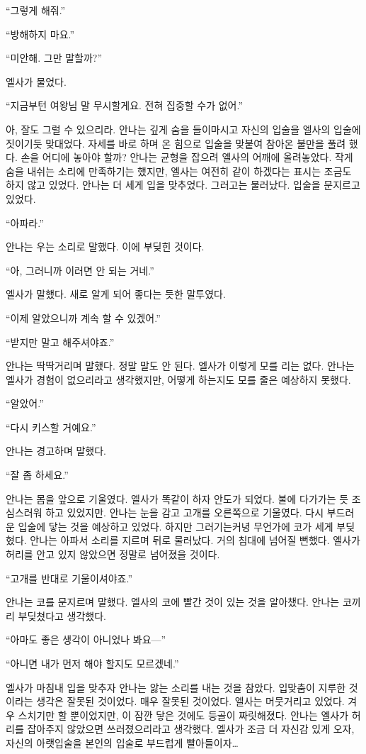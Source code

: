 ``그렇게 해줘.''

``방해하지 마요.''

``미안해. 그만 말할까?''

엘사가 물었다.

``지금부턴 여왕님 말 무시할게요. 전혀 집중할 수가 없어.''

아, 잘도 그럴 수 있으리라. 안나는 깊게 숨을 들이마시고 자신의 입술을 엘사의 입술에 짓이기듯 맞대었다. 자세를 바로 하며 온 힘으로 입술을 맞붙여 참아온 불만을 풀려 했다. 손을 어디에 놓아야 할까? 안나는 균형을 잡으려 엘사의 어깨에 올려놓았다. 작게 숨을 내쉬는 소리에 만족하기는 했지만, 엘사는 여전히 같이 하겠다는 표시는 조금도 하지 않고 있었다. 안나는 더 세게 입을 맞추었다. 그러고는 물러났다. 입술을 문지르고 있었다.

``아파라.''

안나는 우는 소리로 말했다. 이에 부딪힌 것이다.

``아, 그러니까 이러면 안 되는 거네.''

엘사가 말했다. 새로 알게 되어 좋다는 듯한 말투였다.

``이제 알았으니까 계속 할 수 있겠어.''

``받지만 말고 해주셔야죠.''

안나는 딱딱거리며 말했다. 정말 말도 안 된다. 엘사가 이렇게 모를 리는 없다. 안나는 엘사가 경험이 없으리라고 생각했지만, 어떻게 하는지도 모를 줄은 예상하지 못했다.

``알았어.''

``다시 키스할 거예요.''

안나는 경고하며 말했다.

``잘 좀 하세요.''

안나는 몸을 앞으로 기울였다. 엘사가 똑같이 하자 안도가 되었다. 불에 다가가는 듯 조심스러워 하고 있었지만. 안나는 눈을 감고 고개를 오른쪽으로 기울였다. 다시 부드러운 입술에 닿는 것을 예상하고 있었다. 하지만 그러기는커녕 무언가에 코가 세게 부딪혔다. 안나는 아파서 소리를 지르며 뒤로 물러났다. 거의 침대에 넘어질 뻔했다. 엘사가 허리를 안고 있지 않았으면 정말로 넘어졌을 것이다.

``고개를 반대로 기울이셔야죠.''

안나는 코를 문지르며 말했다. 엘사의 코에 빨간 것이 있는 것을 알아챘다. 안나는 코끼리 부딪쳤다고 생각했다.

``아마도 좋은 생각이 아니었나 봐요—''

``아니면 내가 먼저 해야 할지도 모르겠네.''

엘사가 마침내 입을 맞추자 안나는 앓는 소리를 내는 것을 참았다. 입맞춤이 지루한 것이라는 생각은 잘못된 것이었다. 매우 잘못된 것이었다. 엘사는 머뭇거리고 있었다. 겨우 스치기만 할 뿐이었지만, 이 잠깐 닿은 것에도 등골이 짜릿해졌다. 안나는 엘사가 허리를 잡아주지 않았으면 쓰러졌으리라고 생각했다. 엘사가 조금 더 자신감 있게 오자, 자신의 아랫입술을 본인의 입술로 부드럽게 빨아들이자\ldots

